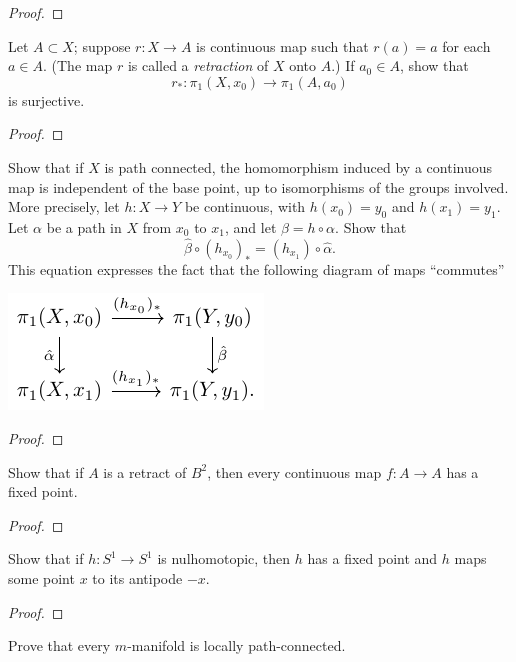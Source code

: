 \begin{proof}
\end{proof}
\newpage
\begin{problem}[Munkres \S52, Ex.\,4]
Let $A\subset X$; suppose $r\colon X\to A$ is continuous map such
that $r(a)=a$ for each $a\in A$. (The map $r$ is called a
\emph{retraction} of $X$ onto $A$.) If $a_0\in A$, show that
\[
r_*\colon\pi_1(X,x_0)\longrightarrow\pi_1(A,a_0)
\]
is surjective.
\end{problem}
\begin{proof}
\end{proof}
\newpage
\begin{problem}[Munkres \S53, Ex.\,6]
Show that if $X$ is path connected, the homomorphism induced by a
continuous map is independent of the base point, up to
isomorphisms of the groups involved. More precisely, let $h\colon
X\to Y$ be continuous, with $h(x_0)=y_0$ and $h(x_1)=y_1$. Let
$\alpha$ be a path in $X$ from $x_0$ to $x_1$, and let
$\beta=h\circ\alpha$. Show that
\[
\hat\beta\circ(h_{x_0})_*=(h_{x_1})\circ\hat\alpha.
\]
This equation expresses the fact that the following diagram of
maps ``commutes''
\begin{center}
\includegraphics{figures/hw-10-path-connected-hom-indep}
\end{center}
\end{problem}
\begin{proof}
\end{proof}
\newpage
\begin{problem}[Munkres \S55, Ex.\,1]
Show that if $A$ is a retract of $B^2$, then every continuous map
$f\colon A\to A$ has a fixed point.
\end{problem}
\begin{proof}
\end{proof}
\newpage
\begin{problem}[Munkres \S55, Ex.\,2]
Show that if $h\colon S^1\to S^1$ is nulhomotopic, then $h$ has a
fixed point and $h$ maps some point $x$ to its antipode $-x$.
\end{problem}
\begin{proof}
\end{proof}
\newpage
\begin{problem}[(A)]
Prove that every $m$-manifold is locally path-connected.
\end{problem}
